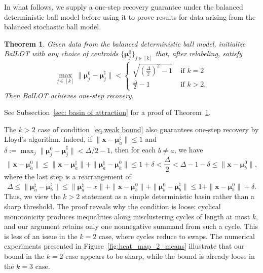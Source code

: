 \documentclass{article}
\theoremstyle{plain}
\newtheorem{theorem}{Theorem}
\theoremstyle{definition}
\newcommand{\1}{\mathbf{1}}
\newcommand{\bmF}{\bm{F}}
\newcommand{\bmu}{\bm{\mu}}
\begin{document}


In what follows, we supply a one-step recovery guarantee under the balanced deterministic ball model before using it to prove results for data arising from the balanced stochastic ball model.

\begin{theorem}
\label{thm:informal_basin_of_attraction}
Given data from the balanced deterministic ball model, initialize BalLOT with any choice of centroids $\{\bmu_j^0\}_{j\in[k]}$ that, after relabeling, satisfy
\begin{equation}
\label{eq.weak bound}
\max_{j\in[k]}\|\bmu_j^0-\bmu_j^\natural\|<\left\{\begin{array}{rl}
\sqrt{(\frac{\Delta}{2})^2-1} &\text{ if } k=2\\[0.7em]
\frac{\Delta}{2}-1 &\text{ if } k>2.
\end{array}\right.
\end{equation}
Then BalLOT achieves one-step recovery.
\end{theorem}

See Subsection~\ref{sec: basin of attraction} for a proof of Theorem~\ref{thm:informal_basin_of_attraction}.

The $k>2$ case of condition~\eqref{eq.weak bound} also guarantees one-step recovery by Lloyd's algorithm.
Indeed, if $\|\bm{x}-\bmu_a^\natural\|\leq1$ and $\delta:=\max_j\|\bmu_j^0-\bmu_j^\natural\|<\Delta/2-1$, then for each $b\neq a$, we have
\[
\|\bm{x}-\bmu_a^0\|
\leq\|\bm{x}-\bmu_a^\natural\|+\|\bmu_a^\natural-\bmu_a^0\|
\leq 1+\delta
<\frac{\Delta}{2}
< \Delta-1-\delta
\leq \|\bm{x}-\bmu_b^0\|,
\]
where the last step is a rearrangement of
\[
\Delta
\leq\|\bmu_a^\natural-\bmu_b^\natural\|
\leq\|\bmu_a^\natural-x\|+\|\bm{x}-\bmu_b^0\|+\|\bmu_b^0-\bmu_b^\natural\|
\leq 1+\|\bm{x}-\bmu_b^0\|+\delta.
\]
Thus, we view the $k>2$ statement as a simple deterministic basin rather than a sharp threshold.
The proof reveals why the condition is loose: cyclical monotonicity produces inequalities along misclustering cycles of length at most $k$, and our argument retains only one nonnegative summand from such a cycle.
This is less of an issue in the $k=2$ case, where cycles reduce to swaps.
The numerical experiments presented in Figure~\ref{fig:heat_map_2_means} illustrate that our bound in the $k=2$ case appears to be sharp, while the bound is already loose in the $k=3$ case.
\end{document}
